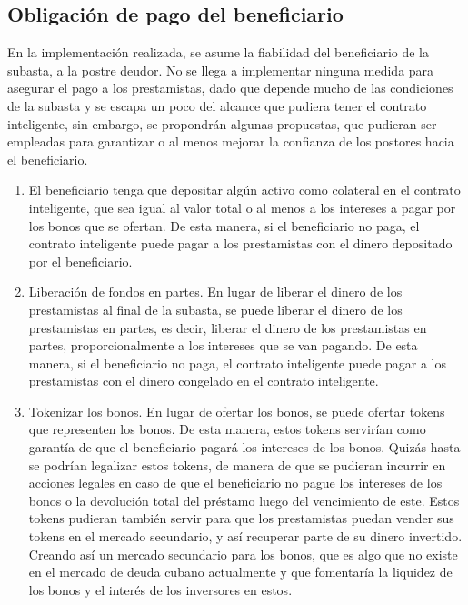   \subsection{Obligación de pago del beneficiario}
    En la implementación realizada, se asume la fiabilidad del beneficiario de la subasta, a la postre deudor. No se llega a implementar
    ninguna medida para asegurar el pago a los prestamistas, dado que depende mucho de las condiciones de la subasta y se escapa un poco
    del alcance que pudiera tener el contrato inteligente, sin embargo, se 
    propondrán algunas propuestas, que pudieran ser empleadas para garantizar o al menos mejorar la confianza de los postores hacia
    el beneficiario.

    \begin{enumerate}
      \item El beneficiario tenga que depositar algún activo como colateral en el contrato inteligente, que sea igual al valor total o al menos
      a los intereses a pagar por los bonos que
      se ofertan. De esta manera, si el beneficiario no paga, el contrato inteligente puede pagar a los prestamistas con el dinero
      depositado por el beneficiario.
      \item Liberación de fondos en partes. En lugar de liberar el dinero de los prestamistas al final de la subasta, se puede liberar el 
      dinero de los prestamistas en partes, es decir, liberar el dinero de los prestamistas en partes, proporcionalmente a los intereses 
      que se
      van pagando. De esta manera, si el beneficiario no paga, el contrato inteligente puede pagar a los prestamistas con el dinero
      congelado en el contrato inteligente.
      \item Tokenizar los bonos. En lugar de ofertar los bonos, se puede ofertar tokens que representen los bonos. De esta manera, estos
      tokens servirían como garantía de que el beneficiario pagará los intereses de los bonos. Quizás hasta se podrían legalizar estos
      tokens, de manera de que se pudieran incurrir en acciones legales en caso de que el beneficiario no pague los intereses de los
      bonos o la devolución total  del préstamo luego del vencimiento de este. Estos tokens pudieran también servir para que los prestamistas
      puedan vender sus tokens en el mercado secundario, y así recuperar parte de su dinero invertido. Creando así un mercado secundario
      para los bonos, que es algo que no existe en el mercado de deuda cubano actualmente y que fomentaría la liquidez de los bonos y el
      interés de los inversores en estos.
    \end{enumerate}

